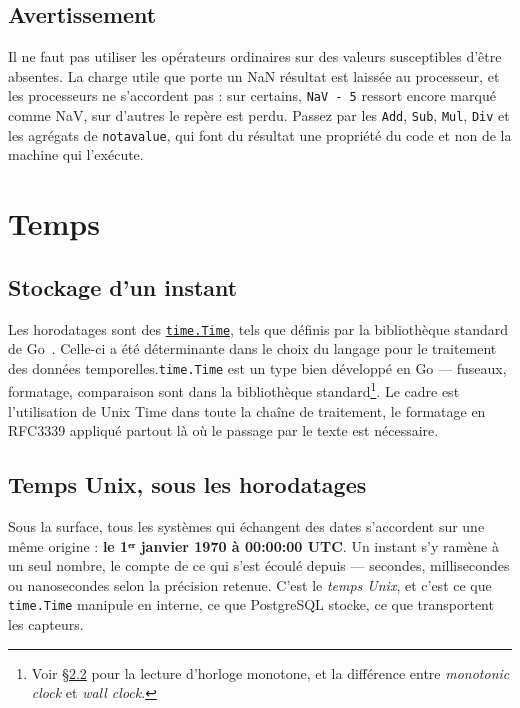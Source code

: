 \documentclass[11pt,a4paper]{report}
\begin{document}
\section{Avertissement}\label{sec:avertissement}

Il ne faut pas utiliser les opérateurs ordinaires sur des valeurs susceptibles
d'être absentes. La charge utile que porte un NaN résultat est laissée
au processeur, et les processeurs ne s'accordent pas : sur certains,
\texttt{NaV\ -\ 5} ressort encore marqué comme NaV, sur d'autres le
repère est perdu. Passez par les \texttt{Add}, \texttt{Sub},
\texttt{Mul}, \texttt{Div} et les agrégats de \texttt{notavalue}, qui
font du résultat une propriété du code et non de la machine qui
l'exécute.

\chapter{Temps}\label{chap:temps}

\section{Stockage d'un instant}

Les horodatages sont des \href{https://pkg.go.dev/time\#Time}{\texttt{time.Time}},
tels que définis par la bibliothèque standard de Go~\cite{gotime}. Celle-ci a été
déterminante dans le choix du langage pour le traitement des données
temporelles.\texttt{time.Time} est un type bien développé en Go ---
fuseaux, formatage, comparaison sont dans la bibliothèque
standard\footnote{Voir §\ref{sec:unix} pour la lecture d'horloge
monotone, et la différence entre \emph{monotonic clock} et \emph{wall
clock}.}. Le cadre est l'utilisation de Unix Time dans toute la chaîne de traitement, le formatage en RFC3339 appliqué partout là où le passage par le texte est nécessaire.

\section{Temps Unix, sous les horodatages}\label{sec:unix}

Sous la surface, tous les systèmes qui échangent des dates s'accordent
sur une même origine : \textbf{le 1ᵉʳ janvier 1970 à 00:00:00 UTC}. Un
instant s'y ramène à un seul nombre, le compte de ce qui s'est écoulé
depuis --- secondes, millisecondes ou nanosecondes selon la précision
retenue. C'est le \emph{temps Unix}, et c'est ce que \texttt{time.Time}
manipule en interne, ce que PostgreSQL stocke, ce que transportent les
capteurs.
\end{document}
